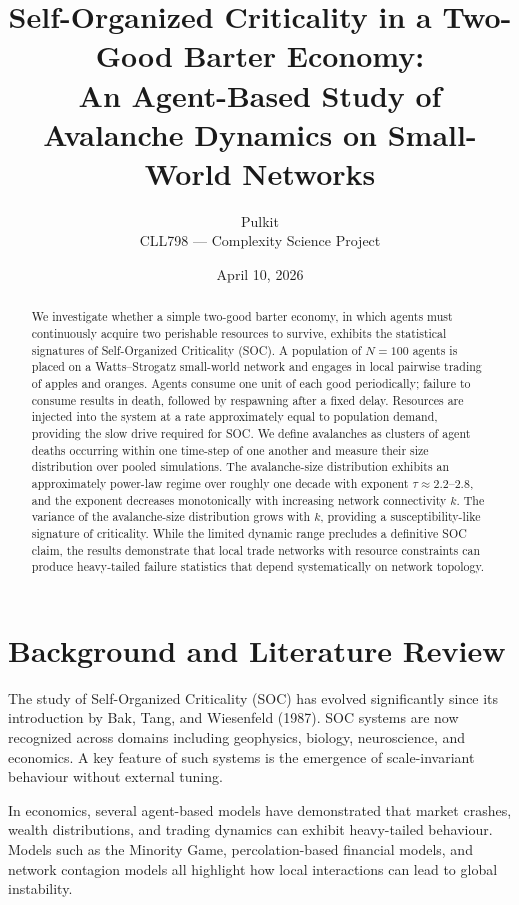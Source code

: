 \documentclass[11pt,a4paper]{article}
\title{\textbf{Self-Organized Criticality in a Two-Good Barter Economy:\\
An Agent-Based Study of Avalanche Dynamics on Small-World Networks}}
\author{Pulkit \\ CLL798 --- Complexity Science Project}
\date{April 10, 2026}
\begin{document}
\maketitle

\begin{abstract}
\noindent
We investigate whether a simple two-good barter economy, in which agents must
continuously acquire two perishable resources to survive, exhibits the
statistical signatures of Self-Organized Criticality (SOC). A population of
$N=100$ agents is placed on a Watts--Strogatz small-world network and engages
in local pairwise trading of apples and oranges. Agents consume one unit of
each good periodically; failure to consume results in death, followed by
respawning after a fixed delay. Resources are injected into the system at a
rate approximately equal to population demand, providing the slow drive
required for SOC. We define avalanches as clusters of agent deaths occurring
within one time-step of one another and measure their size distribution over
pooled simulations. The avalanche-size distribution exhibits an
approximately power-law regime over roughly one decade with exponent
$\tau \approx 2.2$--$2.8$, and the exponent decreases monotonically with
increasing network connectivity $k$. The variance of the avalanche-size
distribution grows with $k$, providing a susceptibility-like signature of
criticality. While the limited dynamic range precludes a definitive SOC
claim, the results demonstrate that local trade networks with resource
constraints can produce heavy-tailed failure statistics that depend
systematically on network topology.
\end{abstract}

\tableofcontents
\newpage
\section{Background and Literature Review}

The study of Self-Organized Criticality (SOC) has evolved significantly since
its introduction by Bak, Tang, and Wiesenfeld (1987). SOC systems are now
recognized across domains including geophysics, biology, neuroscience, and
economics. A key feature of such systems is the emergence of scale-invariant
behaviour without external tuning.

In economics, several agent-based models have demonstrated that market crashes,
wealth distributions, and trading dynamics can exhibit heavy-tailed behaviour.
Models such as the Minority Game, percolation-based financial models, and
network contagion models all highlight how local interactions can lead to
global instability.
\end{document}
